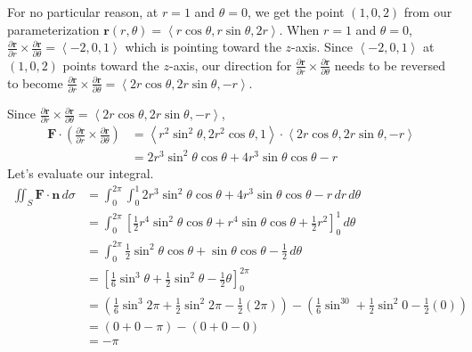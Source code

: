 \documentclass{article}
\newcommand{\lrp}[1]{\left( #1 \right)}
\newcommand{\lra}[1]{\left\langle #1 \right\rangle}
\newcommand{\lrb}[1]{\left[ #1 \right]}
\renewcommand{\r}[0]{\mathbf{r}}
\newcommand{\F}[0]{\mathbf{F}}
\newcommand{\n}[0]{\mathbf{n}}
\begin{document}
For no particular reason, at $r=1$ and $\theta =0$, we get the point $(1,0,2)$ from our parameterization $\r(r,\theta)=\lra{r\cos\theta, r\sin\theta,2r}$. When $r=1$ and $\theta=0$, $\displaystyle \frac{\partial \r}{\partial r}\times  \frac{\partial \r }{\partial \theta}=\lra{-2, 0, 1}$ which is pointing toward the $z$-axis. Since $\lra{-2,0,1}$ at $(1,0,2)$ points toward the $z$-axis, our direction for $\displaystyle \frac{\partial \r}{\partial r}\times  \frac{\partial \r }{\partial \theta}$ needs to be reversed to become $\displaystyle \frac{\partial \r}{\partial r}\times  \frac{\partial \r }{\partial \theta}=\lra{2r\cos\theta, 2r\sin\theta, -r}$.
\begin{center}
\end{center}
Since $\displaystyle \frac{\partial \r}{\partial r}\times  \frac{\partial \r }{\partial \theta}=\lra{2r\cos\theta, 2r\sin\theta, -r}$,
\begin{align*}
    \F\cdot \lrp{\frac{\partial \r}{\partial r}\times \frac{\partial \r}{\partial \theta}}&=\lra{r^2\sin^2\theta, 2r^2\cos\theta, 1}\cdot\lra{2r\cos\theta, 2r\sin\theta, -r}\\
    &=2r^3\sin^2\theta\cos\theta + 4r^3\sin\theta\cos\theta - r
\end{align*}
Let's evaluate our integral.
\begin{align*}
   \iint_S \F\cdot \n \,d\sigma &= \int_0^{2\pi}\int_0^1 2r^3\sin^2\theta\cos\theta + 4r^3\sin\theta\cos\theta - r\,dr\,d\theta\\
    &=\int_0^{2\pi}\lrb{\frac{1}{2}r^4\sin^2\theta\cos\theta + r^4\sin\theta\cos\theta+\frac{1}{2}r^2}_0^1\,d\theta\\
    &=\int_0^{2\pi}\frac{1}{2}\sin^2\theta\cos\theta+\sin\theta\cos\theta-\frac{1}{2}\,d\theta\\
    &=\lrb{\frac{1}{6}\sin^3\theta+\frac{1}{2}\sin^2\theta-\frac{1}{2}\theta}_0^{2\pi}\tag{or do $u$-sub(s) with $u=\sin\theta$}\\
    &=\lrp{\frac{1}{6}\sin^3 2\pi+\frac{1}{2}\sin^2 2\pi -\frac{1}{2}\lrp{2\pi}}-\lrp{\frac{1}{6}\sin^30 +\frac{1}{2}\sin^2 0-\frac{1}{2}(0)}\\
    &=\lrp{0+0-\pi}-\lrp{0+0-0}\\
    &=\boxed{-\pi}
\end{align*}
\end{document}
